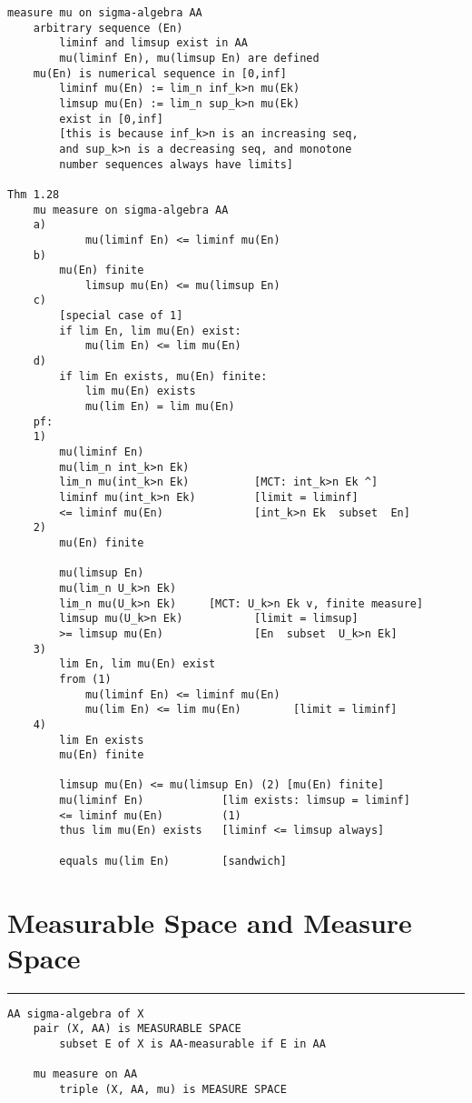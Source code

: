 \documentclass{article}
\begin{document}
\begin{flushleft}
\begin{verbatim}
measure mu on sigma-algebra AA 
    arbitrary sequence (En) 
        liminf and limsup exist in AA
        mu(liminf En), mu(limsup En) are defined 
    mu(En) is numerical sequence in [0,inf]
        liminf mu(En) := lim_n inf_k>n mu(Ek)
        limsup mu(En) := lim_n sup_k>n mu(Ek) 
        exist in [0,inf]
        [this is because inf_k>n is an increasing seq,
        and sup_k>n is a decreasing seq, and monotone
        number sequences always have limits]

Thm 1.28
    mu measure on sigma-algebra AA 
    a) 
            mu(liminf En) <= liminf mu(En)
    b) 
        mu(En) finite
            limsup mu(En) <= mu(limsup En)
    c) 
        [special case of 1]
        if lim En, lim mu(En) exist:
            mu(lim En) <= lim mu(En)
    d)
        if lim En exists, mu(En) finite:
            lim mu(En) exists 
            mu(lim En) = lim mu(En)
    pf:
    1)
        mu(liminf En)
        mu(lim_n int_k>n Ek)
        lim_n mu(int_k>n Ek)          [MCT: int_k>n Ek ^]
        liminf mu(int_k>n Ek)         [limit = liminf]
        <= liminf mu(En)              [int_k>n Ek  subset  En]
    2)
        mu(En) finite 

        mu(limsup En)
        mu(lim_n U_k>n Ek)
        lim_n mu(U_k>n Ek)     [MCT: U_k>n Ek v, finite measure]
        limsup mu(U_k>n Ek)           [limit = limsup]
        >= limsup mu(En)              [En  subset  U_k>n Ek]
    3)
        lim En, lim mu(En) exist 
        from (1)
            mu(liminf En) <= liminf mu(En)  
            mu(lim En) <= lim mu(En)        [limit = liminf]
    4)
        lim En exists 
        mu(En) finite 

        limsup mu(En) <= mu(limsup En) (2) [mu(En) finite]
        mu(liminf En)            [lim exists: limsup = liminf]
        <= liminf mu(En)         (1)
        thus lim mu(En) exists   [liminf <= limsup always]

        equals mu(lim En)        [sandwich]
\end{verbatim}

\section*{Measurable Space and Measure Space}
\bigbreak
\hrule
\bigbreak

\begin{verbatim}
AA sigma-algebra of X
    pair (X, AA) is MEASURABLE SPACE 
        subset E of X is AA-measurable if E in AA 

    mu measure on AA 
        triple (X, AA, mu) is MEASURE SPACE 


\end{verbatim}
\end{flushleft}
\end{document}
